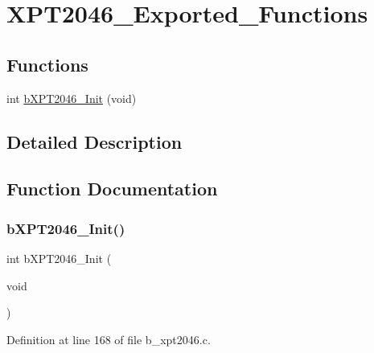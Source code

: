 \hypertarget{group___x_p_t2046___exported___functions}{}\section{X\+P\+T2046\+\_\+\+Exported\+\_\+\+Functions}
\label{group___x_p_t2046___exported___functions}
\subsection*{Functions}
\begin{DoxyCompactItemize}
\item 
int \mbox{\hyperlink{group___x_p_t2046___exported___functions_ga154a04ec3490a9d74bd6dda386389871}{b\+X\+P\+T2046\+\_\+\+Init}} (void)
\end{DoxyCompactItemize}


\subsection{Detailed Description}


\subsection{Function Documentation}
\mbox{\label{group___x_p_t2046___exported___functions_ga154a04ec3490a9d74bd6dda386389871}} 
\subsubsection{\texorpdfstring{b\+X\+P\+T2046\+\_\+\+Init()}{bXPT2046\_Init()}}
{\footnotesize\ttfamily int b\+X\+P\+T2046\+\_\+\+Init (\begin{DoxyParamCaption}\item[{void}]{ }\end{DoxyParamCaption})}



Definition at line 168 of file b\+\_\+xpt2046.\+c.

